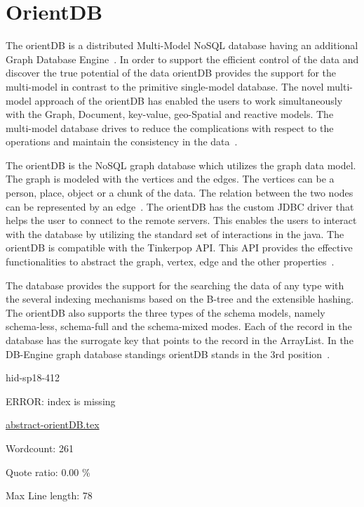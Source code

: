 \section{OrientDB}
The orientDB  is a distributed Multi-Model NoSQL database having an additional
Graph Database Engine~\cite{hid-sp18-412-orientDB_by_CallidusCloud}. In order
to support the efficient control of the data and
discover the true potential of the data orientDB provides the support for the
multi-model in contrast to the primitive single-model database. The novel
multi-model approach of the orientDB has enabled the users to work
simultaneously with the Graph, Document, key-value, geo-Spatial and
reactive models. The multi-model database drives to reduce the
complications with respect to the operations and maintain the consistency
in the data~\cite{hid-sp18-412-orientDB_multimodel}.

The orientDB is the NoSQL graph database which utilizes the graph data model. 
The graph is modeled with the vertices and the edges. The vertices can be a 
person, place, object or a chunk of the data. The relation between the two 
nodes can be represented by an edge~\cite{hid-sp18-412-orientDB_graph}. 
The orientDB has the custom JDBC driver that helps the user to connect 
to the remote servers. This enables the users to interact with the 
database by utilizing the standard set of interactions in the java. 
The orientDB is compatible with the Tinkerpop API. This API provides 
the effective functionalities to abstract the graph, vertex, edge 
and the other properties~\cite{hid-sp18-412-orientDB_graph}.

The database provides the support for the searching
the data of any type with the several indexing mechanisms based on the
B-tree and the extensible hashing. The orientDB also supports the three 
types of the schema models, namely schema-less, schema-full and the 
schema-mixed modes. Each of the record in the database has the 
surrogate key that points to the record in the ArrayList. In the DB-Engine 
graph database standings orientDB stands 
in the 3rd position~\cite{hid-sp18-412-orientDB_wiki}.








\begin{IU}

hid-sp18-412

ERROR: index is missing

\href{https://github.com/cloudmesh-community/hid-sp18-412/blob/master//technology/abstract-orientDB.tex}{abstract-orientDB.tex}

 

Wordcount: 261


Quote ratio: 0.00 \%
 
Max Line length: 78
\end{IU}

